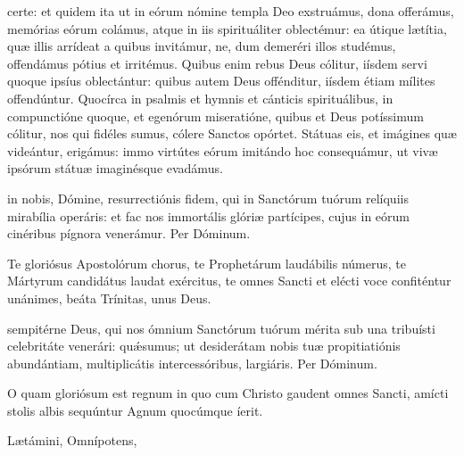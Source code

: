\documentclass[fontsize=9pt,paper=A6,twoside,BCOR=1mm,DIV=22,headinclude]{scrarticle}
\begin{document}
\begin{multicols}{2}
{\RVMmv 

 certe: et quidem ita ut in eórum nómine templa Deo exstruámus, dona offerámus, memórias eórum colámus, atque in iis spirituáliter oblectémur: ea útique lætítia, quæ illis arrídeat a quibus invitámur, ne, dum demeréri illos studémus, offendámus pótius et irritémus. Quibus enim rebus Deus cólitur, iísdem servi quoque ipsíus oblectántur: quibus autem Deus offénditur, iísdem étiam mílites offendúntur. Quocírca in psalmis et hymnis et cánticis spirituálibus, in compunctióne quoque, et egenórum miseratióne, quibus et Deus potíssimum cólitur, nos qui fidéles sumus, cólere Sanctos opórtet. Státuas eis, et imágines quæ videántur, erigámus: immo virtútes eórum imitándo hoc consequámur, ut vivæ ipsórum státuæ imaginésque evadámus.

\RVMmvi 


}


\VRMmii 

\BMm

 in nobis, Dómine, resurrectiónis fidem, qui in Sanctórum tuórum relíquiis mirabília operáris: et fac nos immortális glóriæ partícipes, cujus in eórum cinéribus pígnora venerámur. Per Dóminum.


\A Te gloriósus Apostolórum chorus, te Prophetárum laudábilis númerus, te Mártyrum candidátus laudat exércitus, te omnes Sancti et elécti voce confiténtur unánimes, beáta Trínitas, unus Deus.

\VRMmi

 sempitérne Deus, qui nos ómnium Sanctórum tuórum mérita sub una tribuísti celebritáte venerári: quǽsumus; ut desiderátam nobis tuæ propitiatiónis abundántiam, multiplicátis intercessóribus, largiáris. Per Dóminum.


\VRMmiii 

\MiiMm


\A O quam gloriósum est regnum in quo cum Christo gaudent omnes Sancti, amícti stolis albis sequúntur Agnum quocúmque íerit.

\V Lætámini,  Omnípotens, 




\end{multicols}
\end{document}
